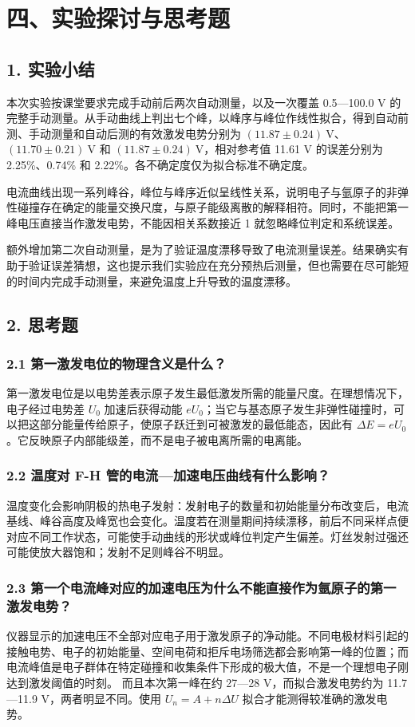 \section*{四、实验探讨与思考题}

\subsection*{1. 实验小结}

本次实验按课堂要求完成手动前后两次自动测量，以及一次覆盖 0.5—100.0 V 的完整手动测量。从手动曲线上判出七个峰，以峰序与峰位作线性拟合，得到自动前测、手动测量和自动后测的有效激发电势分别为 $(11.87\pm0.24)\ \mathrm V$、$(11.70\pm0.21)\ \mathrm V$ 和 $(11.87\pm0.24)\ \mathrm V$，相对参考值 11.61 V 的误差分别为 2.25\%、0.74\% 和 2.22\%。各不确定度仅为拟合标准不确定度。

电流曲线出现一系列峰谷，峰位与峰序近似呈线性关系，说明电子与氩原子的非弹性碰撞存在确定的能量交换尺度，与原子能级离散的解释相符。同时，不能把第一峰电压直接当作激发电势，不能因相关系数接近 1 就忽略峰位判定和系统误差。

额外增加第二次自动测量，是为了验证温度漂移导致了电流测量误差。结果确实有助于验证误差猜想，这也提示我们实验应在充分预热后测量，但也需要在尽可能短的时间内完成手动测量，来避免温度上升导致的温度漂移。

\subsection*{2. 思考题}

\subsubsection*{2.1 第一激发电位的物理含义是什么？}

第一激发电位是以电势差表示原子发生最低激发所需的能量尺度。在理想情况下，电子经过电势差 $U_0$ 加速后获得动能 $eU_0$；当它与基态原子发生非弹性碰撞时，可以把这部分能量传给原子，使原子跃迁到可被激发的最低能态，因此有 $\Delta E=eU_0$。它反映原子内部能级差，而不是电子被电离所需的电离能。

\subsubsection*{2.2 温度对 F-H 管的电流—加速电压曲线有什么影响？}

温度变化会影响阴极的热电子发射：发射电子的数量和初始能量分布改变后，电流基线、峰谷高度及峰宽也会变化。温度若在测量期间持续漂移，前后不同采样点便对应不同工作状态，可能使手动曲线的形状或峰位判定产生偏差。灯丝发射过强还可能使放大器饱和；发射不足则峰谷不明显。

\subsubsection*{2.3 第一个电流峰对应的加速电压为什么不能直接作为氩原子的第一激发电势？}

仪器显示的加速电压不全部对应电子用于激发原子的净动能。不同电极材料引起的接触电势、电子的初始能量、空间电荷和拒斥电场筛选都会影响第一峰的位置；而电流峰值是电子群体在特定碰撞和收集条件下形成的极大值，不是一个理想电子刚达到激发阈值的时刻。
而且本次第一峰在约 27—28 V，而拟合激发电势约为 11.7—11.9 V，两者明显不同。使用 $U_n=A+n\Delta U$ 拟合才能测得较准确的激发电势。
